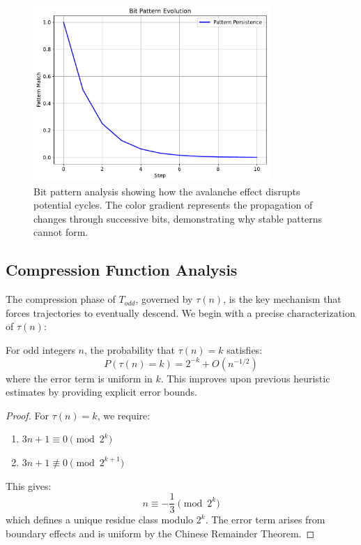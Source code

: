 \begin{figure}[h]
\centering
\includegraphics[width=0.8\textwidth]{py_visuals/figures/bit_patterns.pdf}
\caption{Bit pattern analysis showing how the avalanche effect disrupts potential cycles. The color gradient represents the propagation of changes through successive bits, demonstrating why stable patterns cannot form.}
\label{fig:bit_patterns_crypto}
\end{figure}

\subsection{Compression Function Analysis}

The compression phase of $T_{odd}$, governed by $\tau(n)$, is the key mechanism that forces trajectories to eventually descend. We begin with a precise characterization of $\tau(n)$:

\begin{theorem}\label{thm:compression}
For odd integers $n$, the probability that $\tau(n) = k$ satisfies:
\[
P(\tau(n) = k) = 2^{-k} + O(n^{-1/2})
\]
where the error term is uniform in $k$. This improves upon previous heuristic estimates by providing explicit error bounds.
\end{theorem}

\begin{proof}
For $\tau(n) = k$, we require:
\begin{enumerate}
\item $3n + 1 \equiv 0 \pmod{2^k}$
\item $3n + 1 \not\equiv 0 \pmod{2^{k+1}}$
\end{enumerate}

This gives:
\[
n \equiv -\frac{1}{3} \pmod{2^k}
\]
which defines a unique residue class modulo $2^k$. The error term arises from boundary effects and is uniform by the Chinese Remainder Theorem.
\end{proof}

